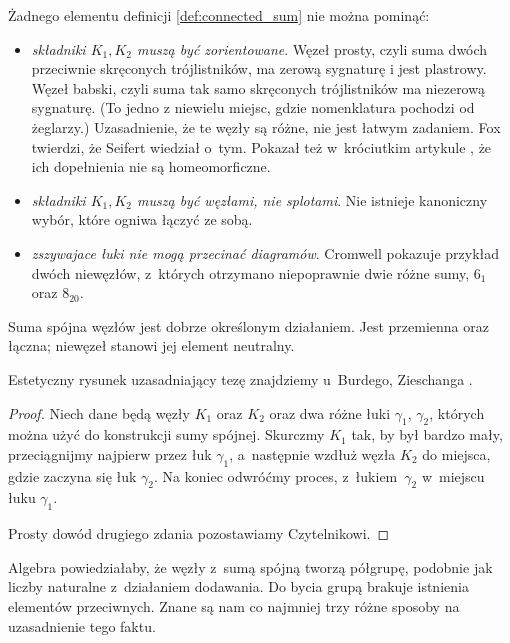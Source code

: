 Żadnego elementu definicji \ref{def:connected_sum} nie można pominąć:
\begin{itemize}
    \item \emph{składniki $K_1, K_2$ muszą być zorientowane}. 
    Węzeł prosty, czyli suma dwóch przeciwnie skręconych trójlistników, ma zerową sygnaturę i jest plastrowy.
%
%
    Węzeł babski, czyli suma tak samo skręconych trójlistników ma niezerową sygnaturę.
    (To jedno z niewielu miejsc, gdzie nomenklatura pochodzi od żeglarzy.)
\label{two_sums_of_two_trefoils}%
    Uzasadnienie, że te węzły są różne, nie jest łatwym zadaniem.
    Fox twierdzi, że Seifert \cite{seifert1933} wiedział o~tym.
    Pokazał też w~króciutkim artykule \cite{fox1952}, że ich dopełnienia nie są homeomorficzne.
    \item \emph{składniki $K_1, K_2$ muszą być węzłami, nie splotami}.
    Nie istnieje kanoniczny wybór, które ogniwa łączyć ze sobą.
    \item \emph{zszywajace łuki nie mogą przecinać diagramów}.
    Cromwell \cite[s. 90]{cromwell2004} pokazuje przykład dwóch niewęzłów, z~których otrzymano niepoprawnie dwie różne sumy, $6_1$ oraz $8_{20}$.
\end{itemize}

\begin{proposition}
    Suma spójna węzłów jest dobrze określonym działaniem.
    Jest przemienna oraz łączna; niewęzeł stanowi jej element neutralny.
\end{proposition}

Estetyczny rysunek uzasadniający tezę znajdziemy u~Burdego, Zieschanga \cite[s. 98]{burde2014}.

\begin{proof}
    Niech dane będą węzły $K_1$ oraz $K_2$ oraz dwa różne łuki $\gamma_1$, $\gamma_2$, których można użyć do konstrukcji sumy spójnej.
    Skurczmy $K_1$ tak, by był bardzo mały, przeciągnijmy najpierw przez łuk $\gamma_1$, a~następnie wzdłuż węzła $K_2$ do miejsca, gdzie zaczyna się łuk $\gamma_2$.
    Na koniec odwróćmy proces, z~łukiem~$\gamma_2$ w~miejscu łuku $\gamma_1$.

    Prosty dowód drugiego zdania pozostawiamy Czytelnikowi.
\end{proof}

Algebra powiedziałaby, że węzły z~sumą spójną tworzą półgrupę, podobnie jak liczby naturalne z~działaniem dodawania.
Do bycia grupą brakuje istnienia elementów przeciwnych. 
Znane są nam co najmniej trzy różne sposoby na uzasadnienie tego faktu.

